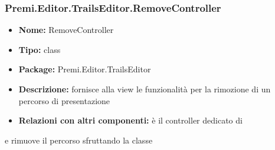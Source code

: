 \subsubsection{Premi.Editor.TrailsEditor.RemoveController}
\begin{itemize}
  \item \textbf{Nome:} RemoveController
  \item \textbf{Tipo:} class
  \item \textbf{Package:} Premi.Editor.TrailsEditor
  \item \textbf{Descrizione:} fornisce alla view le funzionalità per la rimozione di un percorso di presentazione
  \item \textbf{Relazioni con altri componenti:} è il controller dedicato di   
\end{itemize} e rimuove il percorso sfruttando la classe 












